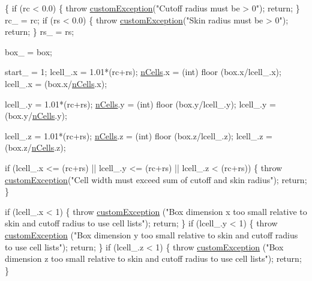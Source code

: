 \begin{DoxyCode}
                                                                             \{
    \textcolor{keywordflow}{if} (rc < 0.0) \{
        \textcolor{keywordflow}{throw} \hyperlink{classcustom_exception}{customException}(\textcolor{stringliteral}{"Cutoff radius must be > 0"});
        \textcolor{keywordflow}{return};
    \}
    rc\_ = rc;
    \textcolor{keywordflow}{if} (rs < 0.0) \{
        \textcolor{keywordflow}{throw} \hyperlink{classcustom_exception}{customException}(\textcolor{stringliteral}{"Skin radius must be > 0"});
        \textcolor{keywordflow}{return};
    \}
    rs\_ = rs;

    box\_ = box;

    start\_ = 1;
    lcell\_.x = 1.01*(rc+rs);
    \hyperlink{classcell_list__cpu_ae86e1c9604a39bc8a493fa0f6538fd37}{nCells}.x = (int) floor (box.x/lcell\_.x);
    lcell\_.x = (box.x/\hyperlink{classcell_list__cpu_ae86e1c9604a39bc8a493fa0f6538fd37}{nCells}.x);

    lcell\_.y = 1.01*(rc+rs);
    \hyperlink{classcell_list__cpu_ae86e1c9604a39bc8a493fa0f6538fd37}{nCells}.y = (int) floor (box.y/lcell\_.y);
    lcell\_.y = (box.y/\hyperlink{classcell_list__cpu_ae86e1c9604a39bc8a493fa0f6538fd37}{nCells}.y);

    lcell\_.z = 1.01*(rc+rs);
    \hyperlink{classcell_list__cpu_ae86e1c9604a39bc8a493fa0f6538fd37}{nCells}.z = (int) floor (box.z/lcell\_.z);
    lcell\_.z = (box.z/\hyperlink{classcell_list__cpu_ae86e1c9604a39bc8a493fa0f6538fd37}{nCells}.z);

    \textcolor{keywordflow}{if} (lcell\_.x <= (rc+rs) || lcell\_.y <= (rc+rs) || lcell\_.z < (rc+rs)) \{
        \textcolor{keywordflow}{throw} \hyperlink{classcustom_exception}{customException}(\textcolor{stringliteral}{"Cell width must exceed sum of
       cutoff and skin radius"});
        \textcolor{keywordflow}{return};
    \}

    \textcolor{keywordflow}{if} (lcell\_.x < 1) \{
        \textcolor{keywordflow}{throw} \hyperlink{classcustom_exception}{customException} (\textcolor{stringliteral}{"Box dimension x too small
       relative to skin and cutoff radius to use cell lists"});
        \textcolor{keywordflow}{return};
    \}
    \textcolor{keywordflow}{if} (lcell\_.y < 1) \{
        \textcolor{keywordflow}{throw} \hyperlink{classcustom_exception}{customException} (\textcolor{stringliteral}{"Box dimension y too small
       relative to skin and cutoff radius to use cell lists"});
        \textcolor{keywordflow}{return};
    \}
    \textcolor{keywordflow}{if} (lcell\_.z < 1) \{
        \textcolor{keywordflow}{throw} \hyperlink{classcustom_exception}{customException} (\textcolor{stringliteral}{"Box dimension z too small
       relative to skin and cutoff radius to use cell lists"});
        \textcolor{keywordflow}{return};
    \}


\end{DoxyCode}
